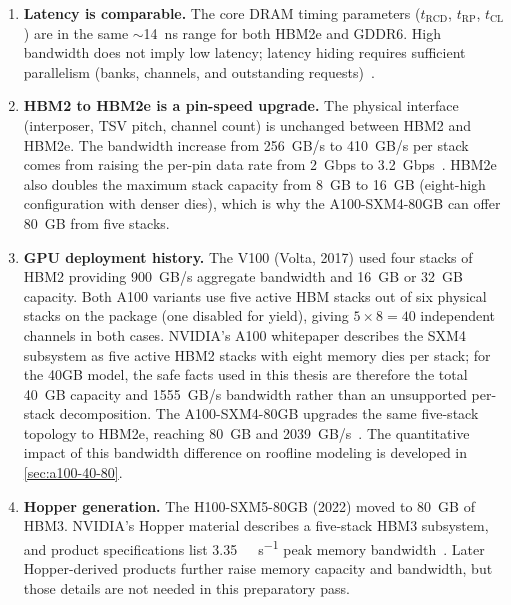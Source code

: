 \begin{enumerate}
  \item \textbf{Latency is comparable.} The core DRAM timing parameters
    ($t_\text{RCD}$, $t_\text{RP}$, $t_\text{CL}$) are in the same
    $\sim$\SI{14}{\nano\second} range for both HBM2e and GDDR6. High
    bandwidth does not imply low latency; latency hiding requires sufficient
    parallelism (banks, channels, and outstanding
    requests)~\cite{li2018highspeed-dram}.
  \item \textbf{HBM2 to HBM2e is a pin-speed upgrade.} The physical
    interface (interposer, TSV pitch, channel count) is unchanged between
    HBM2 and HBM2e. The bandwidth increase from \SI{256}{GB/s} to
    \SI{410}{GB/s} per stack comes from raising the per-pin data rate from
    \SI{2}{Gbps} to \SI{3.2}{Gbps}~\cite{micron2021hbm2e}. HBM2e also
    doubles the maximum stack capacity from \SI{8}{GB} to \SI{16}{GB}
    (eight-high configuration with denser dies), which is why the
    A100-SXM4-80GB can offer \SI{80}{GB} from five stacks.
  \item \textbf{GPU deployment history.} The V100 (Volta, 2017) used four
    stacks of HBM2 providing \SI{900}{GB/s} aggregate bandwidth and
    \SI{16}{GB} or \SI{32}{GB} capacity. Both A100 variants use five active
    HBM stacks out of six physical stacks on the package (one disabled for
    yield), giving $5 \times 8 = 40$ independent channels in both cases.
    NVIDIA's A100 whitepaper describes the SXM4 subsystem as five active HBM2
    stacks with eight memory dies per stack; for the 40GB model, the safe
    facts used in this thesis are therefore the total \SI{40}{GB} capacity and
    \SI{1555}{GB/s} bandwidth rather than an unsupported per-stack
    decomposition. The A100-SXM4-80GB upgrades the same five-stack topology to
    HBM2e, reaching \SI{80}{GB} and \SI{2039}{GB/s}~\cite{nvidia2020a100,micron2021hbm2e}. The quantitative impact of this
    bandwidth difference on roofline modeling is developed in
    \cref{sec:a100-40-80}.
  \item \textbf{Hopper generation.} The H100-SXM5-80GB (2022) moved to
    \SI{80}{GB} of HBM3. NVIDIA's Hopper material describes a five-stack HBM3
    subsystem, and product specifications list \SI{3.35}{\tera\byte\per\second}
    peak memory bandwidth~\cite{nvidia-hopper-in-depth,nvidia-h100-product-specs}. Later Hopper-derived products further raise memory capacity and
    bandwidth, but those details are not needed in this preparatory pass.
\end{enumerate}
